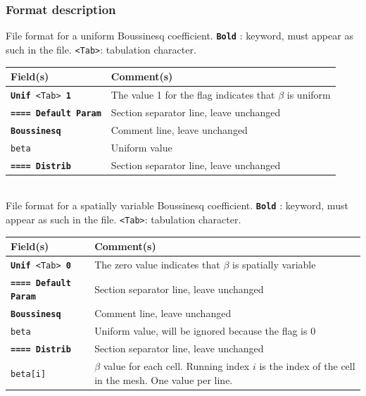 \subsubsection{Format description}
%
File format for a uniform Boussinesq coefficient. \texttt{\textbf{Bold}} : keyword, must appear as such in the file. \texttt{<Tab>}: tabulation character. \\
    \begin{tabular}{p{5cm} | p{10 cm}}
    \hline
    Field(s) & Comment(s) \\
    \hline  \hline
    \texttt{\textbf{Unif} <Tab> \textbf{1}} & The value 1 for the flag indicates that $\beta$ is uniform \\ \hline
    \texttt{\textbf{==== Default Param}} & Section separator line, leave unchanged \\  \hline
    \texttt{\textbf{Boussinesq}} & Comment line, leave unchanged \\  \hline
    \texttt{beta}     & Uniform value \\ 
    \texttt{\textbf{==== Distrib}} & Section separator line, leave unchanged \\  
    \hline
    \end{tabular}
%
\vspace{10mm} \\
%
File format for a spatially variable Boussinesq coefficient. \texttt{\textbf{Bold}} : keyword, must appear as such in the file. \texttt{<Tab>}: tabulation character.  \\
    \begin{tabular}{p{5cm} | p{10 cm}}
    \hline
    Field(s) & Comment(s) \\
    \hline  \hline
    \texttt{\textbf{Unif} <Tab> \textbf{0}} & The zero value indicates that $\beta$ is spatially variable \\ \hline
    \texttt{\textbf{==== Default Param}} & Section separator line, leave unchanged \\  \hline
    \texttt{\textbf{Boussinesq}} & Comment line, leave unchanged \\  \hline
    \texttt{beta}     & Uniform value, will be ignored because the flag is 0 \\ 
    \hline
    \texttt{\textbf{==== Distrib}} & Section separator line, leave unchanged \\  \hline
    \texttt{beta[i]} & $\beta$ value for each cell. Running index $i$ is the index of the cell in the mesh. One value per line.  \\ 
    \hline
    \end{tabular}
